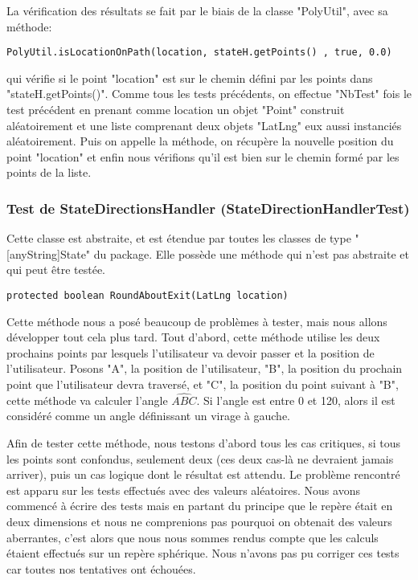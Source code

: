 \newpage La vérification des résultats se fait par le biais de la classe "PolyUtil", avec sa méthode:

\begin{lstlisting}
PolyUtil.isLocationOnPath(location, stateH.getPoints() , true, 0.0)
\end{lstlisting}\bigskip

qui vérifie si le point "location" est sur le chemin défini par les points dans "stateH.getPoints()". Comme tous les tests précédents, on effectue "NbTest" fois le test précédent en prenant comme location un objet "Point" construit aléatoirement et une liste comprenant deux objets "LatLng" eux aussi instanciés aléatoirement. Puis on appelle la méthode, on récupère la nouvelle position du point "location" et enfin nous vérifions qu'il est bien sur le chemin formé par les points de la liste.

\subsubsection{Test de StateDirectionsHandler (StateDirectionHandlerTest)}

Cette classe est abstraite, et est étendue par toutes les classes de type "[anyString]State" du package. Elle possède une méthode qui n'est pas abstraite et qui peut être testée.\\

\begin{lstlisting}
protected boolean RoundAboutExit(LatLng location)
\end{lstlisting}\bigskip

Cette méthode nous a posé beaucoup de problèmes à tester, mais nous allons développer tout cela plus tard. Tout d'abord, cette méthode utilise les deux prochains points par lesquels l'utilisateur va devoir passer et la position de l'utilisateur. Posons "A", la position de l'utilisateur, "B", la position du prochain point que l'utilisateur devra traversé, et "C", la position du point suivant à "B", cette méthode va calculer l'angle $\widehat{ABC}$. Si l'angle est entre 0 et 120, alors il est considéré comme un angle définissant un virage à gauche.\newline

Afin de tester cette méthode, nous testons d'abord tous les cas critiques, si tous les points sont confondus, seulement deux (ces deux cas-là ne devraient jamais arriver), puis un cas logique dont le résultat est attendu. Le problème rencontré est apparu sur les tests effectués avec des valeurs aléatoires. Nous avons commencé à écrire des tests mais en partant du principe que le repère était en deux dimensions et nous ne comprenions pas pourquoi on obtenait des valeurs aberrantes, c'est alors que nous nous sommes rendus compte que les calculs étaient effectués sur un repère sphérique. Nous n'avons pas pu corriger ces tests car toutes nos tentatives ont échouées.\newpage

